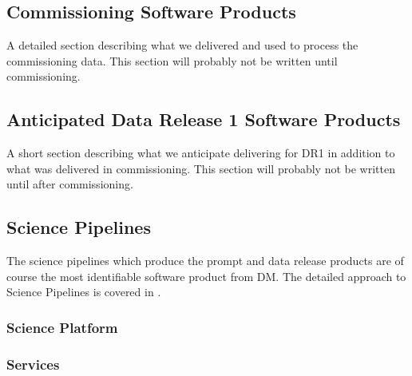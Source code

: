 \subsection{Commissioning Software Products}
A detailed section describing what we delivered and used to process the commissioning data.
This section will probably not be written until  commissioning.

\subsection{Anticipated Data Release 1 Software Products}
A short section describing what we anticipate delivering  for DR1 in addition to what was delivered in commissioning.
This section will probably not be written until after commissioning.

\subsection{Science Pipelines}\label{sec:pipes}
The science pipelines which produce the prompt and data release products are of course the most identifiable
software product from DM.
The detailed approach to Science Pipelines is covered in \cite{PSTN-019}.


\subsubsection{Science Platform}

\subsubsection{Services}
